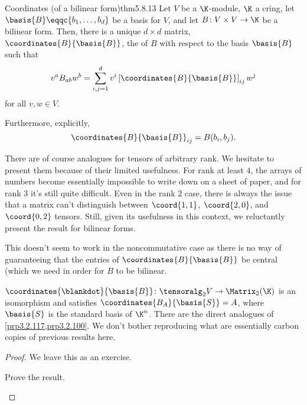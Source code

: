 \begin{thm}{Coordinates (of a bilinear form)}{thm5.8.13}
	Let $V$ be a $\K$-module, $\K$ a cring, let $\basis{B}\eqqc \{ b_1,\ldots ,b_d\}$ be a basis for $V$, and let $B\colon V\times V\rightarrow \K$ be a bilinear form.  Then, there is a unique $d\times d$ matrix, $\coordinates{B}{\basis{B}}$, the  of $B$ with respect to the basis $\basis{B}$ such that
	\begin{equation}\label{eqn5.8.9}
		v^aB_{ab}w^b=\sum _{i,j=1}^dv^i\left[ \coordinates{B}{\basis{B}}\right] _{ij}w^j
	\end{equation}
	for all $v,w\in V$.
	
	Furthermore, explicitly,
	\begin{equation}\label{eqn5.8.14}
		\coordinates{B}{\basis{B}}_{ij}=B(b_i,b_j).
	\end{equation}
	\begin{rmk}
		There are of course analogues for tensors of arbitrary rank.  We hesitate to present them because of their limited usefulness.  For rank at least $4$, the arrays of numbers become essentially impossible to write down on a sheet of paper, and for rank $3$ it's still quite difficult.  Even in the rank $2$ case, there is always the issue that a matrix can't distinguish between $\coord{1,1}$, $\coord{2,0}$, and $\coord{0,2}$ tensors.  Still, given its usefulness in this context, we reluctantly present the result for bilinear forms.
	\end{rmk}
	\begin{rmk}
		This doesn't seem to work in the noncommutative case as there is no way of guaranteeing that the entries of $\coordinates{B}{\basis{B}}$ be central (which we need in order for $B$ to be bilinear.
	\end{rmk}
	\begin{rmk}
		$\coordinates{\blankdot}{\basis{B}}\colon \tensoralg _2V\rightarrow \Matrix _2(\K )$ is an isomorphism and satisfies $\coordinates{B_A}{\basis{S}}=A$, where $\basis{S}$ is the standard basis of $\K ^n$.  There are the direct analogues of \cref{prp3.2.117,prp3.2.100}.  We don't bother reproducing what are essentially carbon copies of previous results here.
	\end{rmk}
	\begin{proof}
		We leave this as an exercise.
		\begin{exr}[breakable=false]{}{}
			Prove the result.
		\end{exr}
	\end{proof}
\end{thm}

